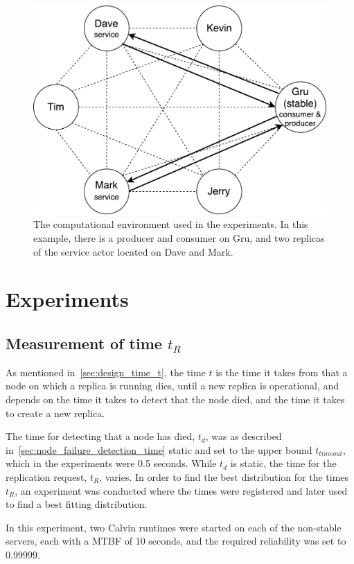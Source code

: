 \documentclass{cslthse-msc}
\begin{document}
\begin{figure}[!hbt]
\centering
\includegraphics[scale=0.5]{images/evaluation_application.pdf} 
\caption{The computational environment used in the experiments. In this example, there is a producer and consumer on Gru, and two replicas of the service actor located on Dave and Mark.} \label{fig:evaluation_application}
\end{figure}

\section{Experiments}

\subsection{Measurement of time $t_R$} \label{sec:eval_time_t}
As mentioned in~\cref{sec:design_time_t}, the time $t$ is the time it takes from that a node on which a replica is running dies, until a new replica is operational, and depends on the time it takes to detect that the node died, and the time it takes to create a new replica. 

The time for detecting that a node has died, $t_d$, was as described in~\cref{sec:node_failure_detection_time} static and set to the upper bound $t_{timeout}$, which in the experiments were 0.5 seconds. While $t_d$ is static, the time for the replication request, $t_R$, varies. In order to find the best distribution for the times $t_R$, an experiment was conducted where the times were registered and later used to find a best fitting distribution.

In this experiment, two Calvin runtimes were started on each of the non-stable servers, each with a MTBF of 10 seconds, and the required reliability was set to 0.99999.
\end{document}
